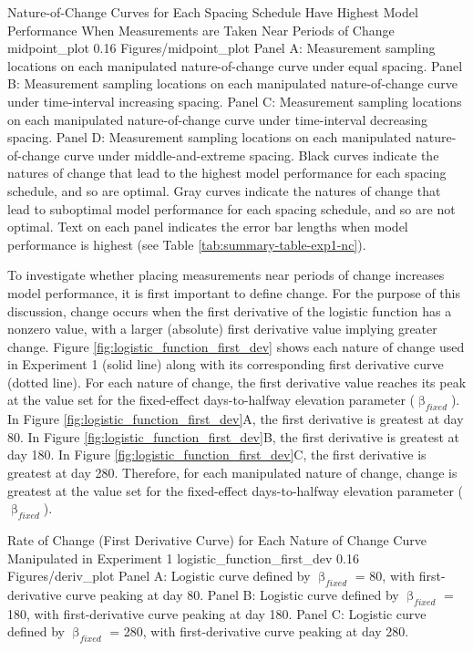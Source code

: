 \documentclass[
12pt, %
twoside,
english]{guelphthesis}
\newcommand{\setMainMatterLinespacing}{
 \setstretch{2} %

        \setstretch{2}
  }
\let\oldRestoreGeometry\restoregeometry
\renewcommand{\restoregeometry}{
  \oldRestoreGeometry

  \setMainMatterLinespacing
}
\begin{document}
\restoregeometry
\begin{apaFigure}
[portrait]
[samepage]
[0cm]
{Nature-of-Change Curves for Each Spacing Schedule Have Highest Model Performance When Measurements are Taken Near Periods of Change}
{midpoint_plot}
{0.16}
{Figures/midpoint_plot}
{Panel A: Measurement sampling locations on each manipulated nature-of-change curve under equal spacing. Panel B: Measurement sampling locations on each manipulated nature-of-change curve under time-interval increasing spacing. Panel C: Measurement sampling locations on each manipulated nature-of-change curve under time-interval decreasing spacing. Panel D: Measurement sampling locations on each manipulated nature-of-change curve under middle-and-extreme spacing. Black curves indicate the natures of change that lead to the highest model performance for each spacing schedule, and so are optimal. Gray curves indicate the natures of change that lead to suboptimal model performance for each spacing schedule, and so are not optimal. Text on each panel indicates the error bar lengths when model performance is highest (see Table \ref{tab:summary-table-exp1-nc}).}
\end{apaFigure}
To investigate whether placing measurements near periods of change increases model performance, it is first important to define change. For the purpose of this discussion, change occurs when the first derivative of the logistic function has a nonzero value, with a larger (absolute) first derivative value implying greater change. Figure \ref{fig:logistic_function_first_dev} shows each nature of change used in Experiment 1 (solid line) along with its corresponding first derivative curve (dotted line). For each nature of change, the first derivative value reaches its peak at the value set for the fixed-effect days-to-halfway elevation parameter (\(\upbeta_{fixed}\)). In Figure \ref{fig:logistic_function_first_dev}A, the first derivative is greatest at day 80. In Figure \ref{fig:logistic_function_first_dev}B, the first derivative is greatest at day 180. In Figure \ref{fig:logistic_function_first_dev}C, the first derivative is greatest at day 280. Therefore, for each manipulated nature of change, change is greatest at the value set for the fixed-effect days-to-halfway elevation parameter (\(\upbeta_{fixed}\)).
\begin{apaFigure}
[portrait]
[samepage]
[0cm]
{Rate of Change (First Derivative Curve) for Each Nature of Change Curve Manipulated in Experiment 1}
{logistic_function_first_dev}
{0.16}
{Figures/deriv_plot}
{Panel A: Logistic curve defined by $\upbeta_{fixed}$ = 80, with first-derivative curve peaking at day 80. Panel B: Logistic curve defined by $\upbeta_{fixed}$ = 180, with first-derivative curve peaking at day 180. Panel C: Logistic curve defined by $\upbeta_{fixed}$ = 280, with first-derivative curve peaking at day 280.}
\end{apaFigure}
\end{document}
